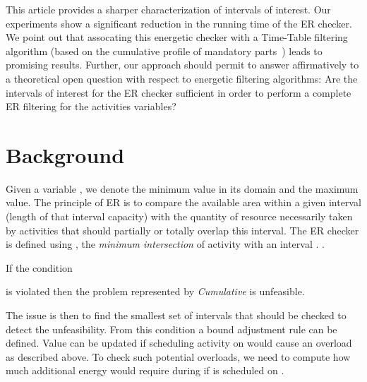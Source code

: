 \documentclass{llncs}
\begin{document}
This article provides a sharper characterization of intervals of interest. 
Our experiments show a significant reduction in the running time of the ER checker. We point out that assocating this energetic checker with a Time-Table filtering algorithm (based on the cumulative profile of mandatory parts~\cite{Letort:ScalableSweep})
leads to promising results. Further, our approach should permit to answer affirmatively to a theoretical open question with respect to energetic filtering algorithms: 
Are the intervals of interest for the ER checker sufficient in order to perform a complete ER filtering for the activities variables?
\section{Background}\label{sec:background}
Given a variable ,
we denote  the minimum value in its domain and  the maximum value. The principle of ER
is to compare the available area within a given interval (length of that interval  capacity) with the quantity of resource necessarily taken by 
activities that should partially or totally overlap this interval. The ER checker is defined using , the \emph{minimum intersection} of activity  with an interval . 
. 


 \begin{proposition}\label{prop:ER}
 If the condition 
  
 is violated then the problem represented by \emph{Cumulative} is unfeasible.
 \end{proposition}
The issue is then to find the smallest set of intervals  that should be checked to detect the unfeasibility.
From this condition a bound adjustment rule can be defined.
Value  can be updated if scheduling activity  on  would cause an overload as described above.
To check such potential overloads, we need to compute how much additional energy   would require during  if  is scheduled on .
\end{document}
